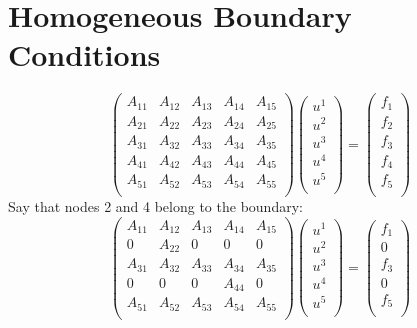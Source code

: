 \documentclass[11pt]{amsart}
\begin{document}
\section{Homogeneous Boundary Conditions}
\[
\left(
\begin{array}{ccccc}
A_{11} & A_{12} & A_{13} & A_{14} & A_{15} \\
A_{21} & A_{22} & A_{23} & A_{24} & A_{25} \\ 
A_{31} & A_{32} & A_{33} & A_{34} & A_{35} \\ 
A_{41} & A_{42} & A_{43} & A_{44} & A_{45} \\ 
A_{51} & A_{52} & A_{53} & A_{54} & A_{55} \\ 
\end{array}
\right)
\left(
\begin{array}{c}
u^1\\
u^2\\
u^3\\
u^4\\
u^5\\
\end{array}
\right)
= 
\left(
\begin{array}{c}
f_1\\
f_2\\
f_3\\
f_4\\
f_5\\
\end{array}
\right)
\]
Say that nodes 2 and 4 belong to the boundary:
\[
\left(
\begin{array}{ccccc}
A_{11} & A_{12} & A_{13} & A_{14} & A_{15} \\
0      & A_{22} & 0      & 0      & 0 \\ 
A_{31} & A_{32} & A_{33} & A_{34} & A_{35} \\ 
0 &  0 & 0      & A_{44} & 0 \\ 
A_{51} & A_{52} & A_{53} & A_{54} & A_{55} \\ 
\end{array}
\right)
\left(
\begin{array}{c}
u^1\\
u^2\\
u^3\\
u^4\\
u^5\\
\end{array}
\right)
= 
\left(
\begin{array}{c}
f_1\\
0\\
f_3\\
0\\
f_5\\
\end{array}
\right)
\]
\end{document}
